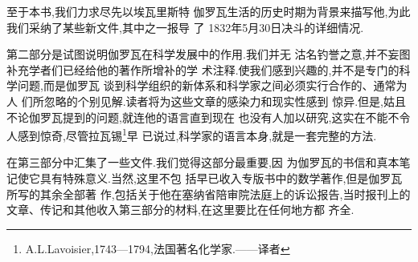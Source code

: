 至于本书,我们力求尽先以埃瓦里斯特 \textbullet 伽罗瓦生活的历史时期为背景来描写他,为此我们采纳了某些新文件,其中之一报导 了 1832年5月30日决斗的详细情况.

第二部分是试图说明伽罗瓦在科学发展中的作用.我们并无 沽名钓誉之意,并不妄图补充学者们已经给他的著作所增补的学 术注释.使我们感到兴趣的,并不是专门的科学问题,而是伽罗瓦 谈到科学组织的新体系和科学家之间必须实行合作的、通常为人 们所忽略的个别见解.读者将为这些文章的感染力和现实性感到 惊异.但是,姑且不论伽罗瓦提到的问题,就连他的语言直到现在 也没有人加以研究,这实在不能不令人感到惊奇,尽管拉瓦锡\footnote{A.L.Lavoisier,1743—1794,法国著名化学家.——译者}早 已说过,科学家的语言本身,就是一套完整的方法.

在第三部分中汇集了一些文件.我们觉得这部分最重要,因 为伽罗瓦的书信和真本笔记使它具有特殊意义.当然,这里不包 括早已收入专版书中的数学著作,但是伽罗瓦所写的其余全部著 作,包括关于他在塞纳省陪审院法庭上的诉讼报告,当时报刊上的 文章、传记和其他收入第三部分的材料,在这里要比在任何地方都 齐全.






